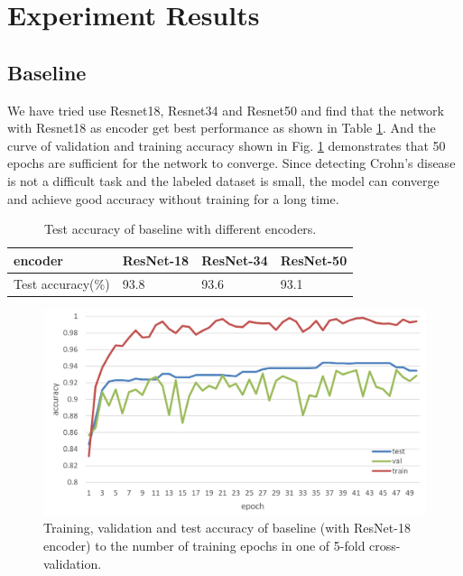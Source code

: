 \documentclass[conference]{IEEEtran}
\begin{document}
\section{Experiment Results}

\subsection{Baseline}

We have tried use Resnet18, Resnet34 and Resnet50 and find that the network with Resnet18 as encoder get best performance as shown in Table \ref{tab:baseline_encoders}. And the curve of validation and training accuracy shown in Fig. \ref{fig:baseline_training_epoch} demonstrates that 50 epochs are sufficient for the network to converge. Since detecting Crohn's disease is not a difficult task and the labeled dataset is small, the model can converge and achieve good accuracy without training for a long time.

\begin{table}[tb]
\caption{Test accuracy of baseline with different encoders.}
\centering
\begin{tabular}{l|lll}
\hline
encoder       & ResNet-18 & ResNet-34 & ResNet-50 \\ \hline
Test accuracy(\%) & {\color[HTML]{FE0000} 93.8}     & 93.6     & 93.1     \\ \hline  
\end{tabular}
\label{tab:baseline_encoders}
\end{table}

\begin{figure}[tb]
    \centering
    \includegraphics[scale=0.26]{images/baseline_resnet18_1round_acc.png}
    \caption{Training, validation and test accuracy of baseline (with ResNet-18 encoder) to the number of training epochs in one of 5-fold cross-validation.}
    \label{fig:baseline_training_epoch}
\end{figure}
\end{document}
